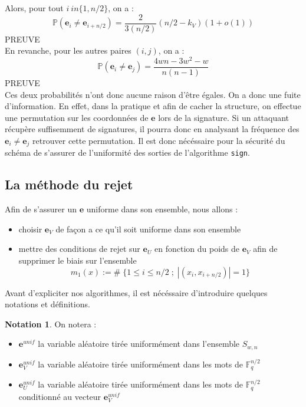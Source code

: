 \documentclass[12pt]{article}
\theoremstyle{definition}
\newtheorem{nota}[thm]{Notation}
\newcommand{\F}{\mathbb{F}}
\newcommand{\e}{\mathbf{e}}
\begin{document}
Alors, pour tout $i \ in \{1,n/2\}$, on a :
$$ \mathbb{P}(\mathbf{e}_i \neq \mathbf{e}_{i+n/2}) = \frac{2}{3(n/2)}(n/2-k_V)(1+o(1))$$
PREUVE \\
En revanche, pour les autres paires $(i,j)$, on a :
$$ \mathbb{P}(\mathbf{e}_i \neq \mathbf{e}_{j}) = \frac{4wn - 3w^2-w}{n(n-1)}$$
PREUVE \\
Ces deux probabilités n'ont donc aucune raison d'être égales. On a donc une fuite d'information. En effet, dans la pratique et afin de cacher la structure, on effectue une permutation sur les coordonnées de $\mathbf{e}$ lors de la signature. Si un attaquant récupère suffisemment de signatures, il pourra donc en analysant la fréquence des $\mathbf{e}_i \neq \mathbf{e}_j$ retrouver cette permutation. Il est donc nécéssaire pour la sécurité du schéma de s'assurer de l'uniformité des sorties de l'algorithme \verb|sign|.

\subsection{La méthode du rejet}
Afin de s'assurer un $\mathbf{e}$ uniforme dans son ensemble, nous allons :
\begin{itemize}
\item choisir $\mathbf{e}_V$ de façon a ce qu'il soit uniforme dans son ensemble 
\item mettre des conditions de rejet sur $\mathbf{e}_U$ en fonction du poids de $\mathbf{e}_V$ afin de supprimer le biais sur l'ensemble 
$$ m_1(x) := \# \; \{1  \leq i \leq n/2 \;;\; |(x_i, x_{i+n/2})| = 1\}$$
\end{itemize}
Avant d'expliciter nos algorithmes, il est nécéssaire d'introduire quelques notations et définitions. \\

\begin{nota} On notera :
\begin{itemize}
\item $\mathbf{e}^{unif}$ la variable aléatoire tirée uniformément dans l'ensemble $S_{w,n}$
\item $\mathbf{e}_V^{unif}$ la variable aléatoire tirée uniformément dans les mots de $\F_q^{n/2}$ 
\item $\mathbf{e}_U^{unif}$ la variable aléatoire tirée uniformément dans les mots de $\F_q^{n/2}$ conditionné au vecteur $\e_V^{unif}$
\end{itemize}
\end{nota}
\end{document}
